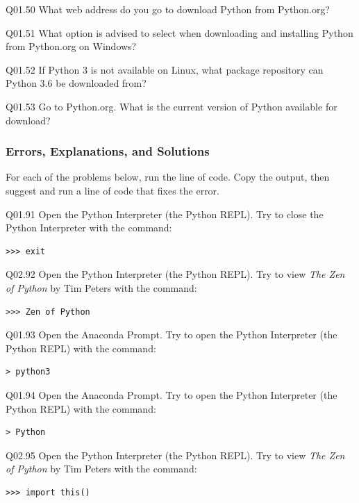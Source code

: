 \documentclass{book}
\newenvironment{problems}{}{}  %
\begin{document}
    
        \begin{problems}
        Q01.50 What web address do you go to download Python from Python.org?

Q01.51 What option is advised to select when downloading and installing
Python from Python.org on Windows?

Q01.52 If Python 3 is not available on Linux, what package repository
can Python 3.6 be downloaded from?

Q01.53 Go to Python.org. What is the current version of Python available
for download?
        \end{problems}

    




    
        \subsubsection{Errors, Explanations, and
Solutions}\label{errors-explanations-and-solutions}
    




    
        \begin{problems}
        For each of the problems below, run the line of code. Copy the output,
then suggest and run a line of code that fixes the error.

Q01.91 Open the Python Interpreter (the Python REPL). Try to close the
Python Interpreter with the command:

\begin{lstlisting}
>>> exit
\end{lstlisting}

Q02.92 Open the Python Interpreter (the Python REPL). Try to view
\emph{The Zen of Python} by Tim Peters with the command:

\begin{lstlisting}
>>> Zen of Python
\end{lstlisting}

Q01.93 Open the Anaconda Prompt. Try to open the Python Interpreter (the
Python REPL) with the command:

\begin{lstlisting}
> python3
\end{lstlisting}

Q01.94 Open the Anaconda Prompt. Try to open the Python Interpreter (the
Python REPL) with the command:

\begin{lstlisting}
> Python
\end{lstlisting}

Q02.95 Open the Python Interpreter (the Python REPL). Try to view
\emph{The Zen of Python} by Tim Peters with the command:

\begin{lstlisting}
>>> import this()
\end{lstlisting}
        \end{problems}
\end{document}
